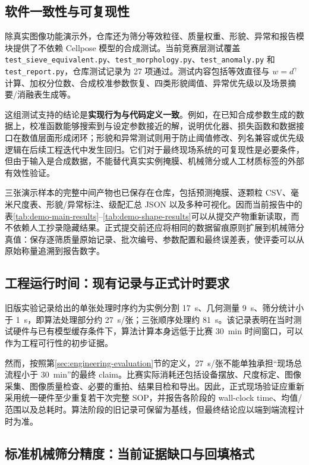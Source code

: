 \subsection{软件一致性与可复现性}
\label{sec:software-validation-results}

除真实图像功能演示外，仓库还为筛分等效粒径、质量权重、形貌、异常和报告模块提供了不依赖 Cellpose 模型的合成测试。当前竞赛层测试覆盖 \texttt{test\_sieve\_equivalent.py}、\texttt{test\_morphology.py}、\texttt{test\_anomaly.py} 和 \texttt{test\_report.py}，仓库测试记录为 27 项通过。测试内容包括等效直径与 $w=d^\gamma$ 计算、加权分位数、合成校准参数恢复、四类形貌阈值、异常优先级以及场景摘要/消融表生成等。

这组测试支持的结论是\textbf{实现行为与代码定义一致}。例如，在已知合成参数生成的数据上，校准函数能够搜索到与设定参数接近的解，说明优化器、损失函数和数据接口在数值层面形成闭环；形貌和异常测试则用于防止阈值修改、列名兼容或优先级逻辑在后续工程迭代中发生回归。它们对于最终现场系统的可复现性是必要条件，但由于输入是合成数据，不能替代真实实例掩膜、机械筛分或人工材质标签的外部有效性验证。

三张演示样本的完整中间产物也已保存在仓库，包括预测掩膜、逐颗粒 CSV、毫米尺度表、形貌/异常标注、级配汇总 JSON 以及多种可视化。因而当前报告中的表\ref{tab:demo-main-results}--\ref{tab:demo-shape-results}可以从提交产物重新读取，而不依赖人工抄录隐藏结果。正式提交前还应将相同的数据留痕原则扩展到机械筛分真值：保存逐筛质量原始记录、批次编号、参数配置和最终误差表，使评委可以从原始称量追溯到报告数字。

\subsection{工程运行时间：现有记录与正式计时要求}
\label{sec:runtime-results}

旧版实验记录给出的单张处理时序约为实例分割 17~s、几何测量 9~s、筛分统计小于 1~s，即算法处理部分约 27~s/张；三张顺序处理约 81~s。该记录表明在当时测试硬件与已有模型缓存条件下，算法计算本身远低于比赛 30~min 时间窗口，可以作为工程可行性的初步证据。

然而，按照第\ref{sec:engineering-evaluation}节的定义，27~s/张不能单独承担“现场总流程小于 30~min”的最终 claim。比赛实际消耗还包括设备摆放、尺度标定、图像采集、图像质量检查、必要的重拍、结果目检和导出。因此，正式现场验证应重新采用统一硬件至少重复若干次完整 SOP，并报告各阶段的 wall-clock time、均值/范围以及总耗时。算法阶段的旧记录可保留为基线，但最终结论应以端到端流程计时为准。

\subsection{标准机械筛分精度：当前证据缺口与回填格式}
\label{sec:physical-accuracy-results}

